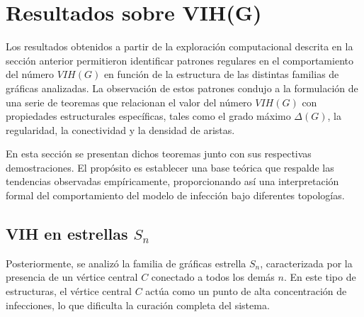 \documentclass[12pt,titlepage,twoside,openright]{book}
\begin{document}
\section{Resultados sobre VIH(G)}

Los resultados obtenidos a partir de la exploraci\'on computacional descrita en la secci\'on anterior permitieron identificar patrones regulares en el comportamiento del n\'umero $VIH(G)$ en funci\'on de la estructura de las distintas familias de gr\'aficas analizadas. La observaci\'on de estos patrones condujo a la formulaci\'on de una serie de teoremas que relacionan el valor del n\'umero $VIH(G)$ con propiedades estructurales espec\'ificas, tales como el grado m\'aximo $\Delta(G)$, la regularidad, la conectividad y la densidad de aristas.

En esta secci\'on se presentan dichos teoremas junto con sus respectivas demostraciones. El prop\'osito es establecer una base te\'orica que respalde las tendencias observadas emp\'iricamente, proporcionando as\'i una interpretaci\'on formal del comportamiento del modelo de infecci\'on bajo diferentes topolog\'ias.

\subsection{VIH en estrellas $S_n$}
Posteriormente, se analiz\'o la familia de gr\'aficas estrella $S_n$, caracterizada por la presencia de un v\'ertice central $C$ conectado a todos los dem\'as $n$. En este tipo de estructuras, el v\'ertice central $C$ act\'ua como un punto de alta concentraci\'on de infecciones, lo que dificulta la curaci\'on completa del sistema. 
\end{document}
